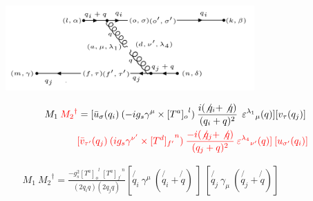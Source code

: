 \begin{figure}[h!]
\centering
\includegraphics[width=0.85\textwidth]{images/QQ/M1M2Degaqqg.png}
\end{figure}


\begin{equation}
\begin{split}
M_1\:{\color[RGB]{255,0,0} {M_2}^{\dagger}} = [{\bar{u}}_{\sigma}(q_i)\: (-ig_s \gamma^{\mu}\times {[T^a]_o}^l) \: \frac{i(\not{q_i} + \not{q})}{(q_i + q)^2}\:\: {\varepsilon^{\lambda_1}}_{\mu} (q)] [{v}_{\tau}(q_j)]\: \\
\quad\quad\quad\quad\quad\quad\quad\quad\:\:{\color[RGB]{255,0,0}[\bar{v}_{{\tau}^{\prime}}(q_j) \: (ig_s \gamma^{{\nu}^{\prime}}\times {[T^d]_{f^{\prime}}}^n) \: \frac{-i(\not{q_j} + \not{q})}{(q_j + q)^2} \: {\varepsilon^{\lambda_4}}_{{\nu}^{\prime}} (q)]\: [{u}_{{\sigma}^{\prime}}(q_i)]}
\end{split}
\end{equation}


%



\begin{equation}
\begin{split}
M_1\: {M_2}^{\dagger} = \frac{-g_s^2 {[T^a]_o}^l \:{[T^a]_{f^{\prime}}}^n }{(2q_i q)(2q_j q)} [\not{q_i}\: \gamma^{\mu} \: (\not{q_i} + \not{q})\: ]
\:[\not{q_j} \:\gamma_{\mu} \: (\not{q_j} + \not{q})]\:
\end{split}
\end{equation}


